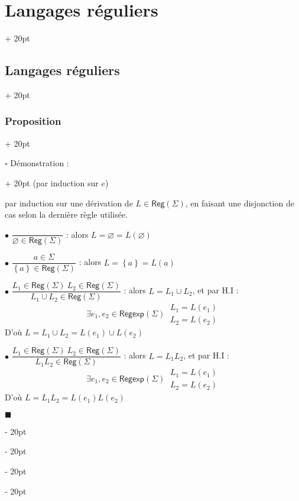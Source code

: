 \documentclass[a4paper, 12pt, twoside]{article}
\newcommand{\set}[1]{\left\{ #1 \right\}}
\newcommand{\ind}[1][20pt]{\advance\leftskip + #1}
\newcommand{\deind}[1][20pt]{\advance\leftskip - #1}
\newenvironment{indt}[2][20pt]{#2 \par \ind[#1]}{\par \deind} %
\newenvironment{proof}[1][{Démonstration :}]{\begin{indt}{$\square$ #1}}{$\blacksquare$ \end{indt}}
\newcommand{\Reg}{\mathsf{Reg}}
\newcommand{\Regexp}{\mathsf{Regexp}}
\begin{document}
\begin{indt}{\section{Langages réguliers}}
\begin{indt}{\subsection{Langages réguliers}}
\begin{indt}{\subsubsection{Proposition}}
                \vspace{12pt}
                
                \begin{proof}
                    \boxed{\Leftarrow} 
                    (par induction sur $e$)

                    \vspace{12pt}
                    
                    \boxed{\Rightarrow} par induction sur une dérivation de $L \in \Reg(\Sigma)$, en faisant une disjonction de cas selon la dernière règle utilisée.

                    \vspace{6pt}
                    
                    $\bullet$ $\dfrac{}{\varnothing \in \Reg(\Sigma)}$ : alors $L = \varnothing = L(\varnothing)$

                    \vspace{6pt}
                    
                    $\bullet$ $\dfrac{a \in \Sigma}{\set a \in \Reg(\Sigma)}$ : alors $L = \set a = L(a)$

                    \vspace{6pt}
                    
                    $\bullet$ $\dfrac{L_1 \in \Reg(\Sigma)\ L_2 \in \Reg(\Sigma)}{L_1 \cup L_2 \in \Reg(\Sigma)}$ : alors $L = L_1 \cup L_2$, et par H.I :
                    \[
                        \exists e_1, e_2 \in \Regexp(\Sigma)\
                        \begin{array}{|l}
                            L_1 = L(e_1)
                            \\
                            L_2 = L(e_2)
                        \end{array}
                    \]
                    D'où $L = L_1 \cup L_2 = L(e_1) \cup L(e_2)$

                    \vspace{6pt}
                    
                    $\bullet$ $\dfrac{L_1 \in \Reg(\Sigma)\ L_2 \in \Reg(\Sigma)}{L_1 L_2 \in \Reg(\Sigma)}$ : alors $L = L_1 L_2$, et par H.I :
                    \[
                        \exists e_1, e_2 \in \Regexp(\Sigma)\
                        \begin{array}{|l}
                            L_1 = L(e_1)
                            \\
                            L_2 = L(e_2)
                        \end{array}
                    \]
                    D'où $L = L_1 L_2 = L(e_1) L(e_2)$


\end{proof}
\end{indt}
\end{indt}
\end{indt}
\end{document}
